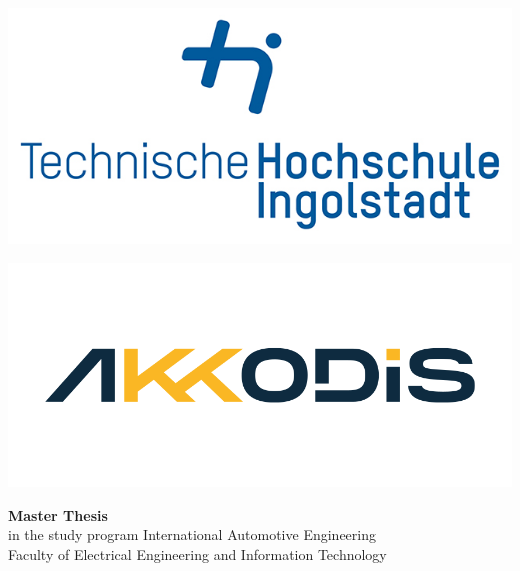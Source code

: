 
\begin{titlepage}
    \begin{center}
        \begin{minipage}[c]{0.4\textwidth}
            \centering
            \includegraphics[width=\textwidth]{figures/thiRGB.jpg}
        \end{minipage}%
        \hfill
        \begin{minipage}[c]{0.4\textwidth}
            \centering
            \includegraphics[width=\textwidth]{figures/Akkodis-Logo-Colour.png}
        \end{minipage}
    \end{center}

    \vspace{2cm}

    \begin{center}
        \hrulefill
    \end{center}

    \vspace{1cm}

    \begin{center}
        \huge\textbf{Master Thesis} \\[2.5em]
        \normalsize
        in the study program International Automotive Engineering \\
        Faculty of Electrical Engineering and Information Technology \\[6em]


\end{center}
\end{titlepage}
